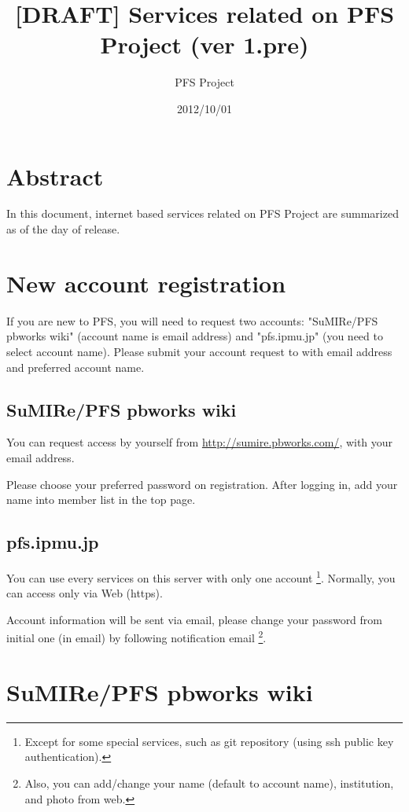 \documentclass[a4paper,notitlepage]{article}
\title{[DRAFT] Services related on PFS Project (ver 1.pre)}
\author{PFS Project}
\date{2012/10/01}
\begin{document}
\maketitle
\tableofcontents

\section{Abstract}

In this document, internet based services related on PFS Project are summarized 
as of the day of release. 

\section{New account registration}

If you are new to PFS, you will need to request two accounts: 
"SuMIRe/PFS pbworks wiki" (account name is email address) 
and "pfs.ipmu.jp" (you need to select account name). 
Please submit your account request to \tbd 
with email address and preferred account name.

\subsection{SuMIRe/PFS pbworks wiki}

You can request access by yourself from \url{http://sumire.pbworks.com/}, 
with your email address.

Please choose your preferred password on registration. 
After logging in, add your name into member list in the top page. 

\subsection{pfs.ipmu.jp}

You can use every services on this server with only one account
\footnote{Except for some special services, such as git repository (using 
ssh public key authentication).}.
Normally, you can access only via Web (https). 

Account information will be sent via email, please change your password 
from initial one (in email) by following notification email 
\footnote{Also, you can add/change your name (default to account name), 
institution, and photo from web.}. 

\section{SuMIRe/PFS pbworks wiki}
\end{document}
